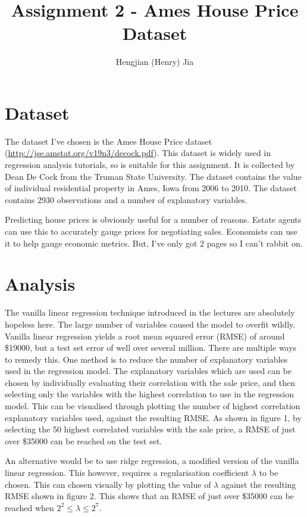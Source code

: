 \documentclass[10pt, twoside]{article}
\begin{document}
\title{Assignment 2 - Ames House Price Dataset}
\author{Hengjian (Henry) Jia}
\maketitle


\section{Dataset}

The dataset I've chosen is the Ames House Price dataset (\url{http://jse.amstat.org/v19n3/decock.pdf}). This dataset is widely used in regression analysis tutorials, so is suitable for this assignment. It is collected by Dean De Cock from the Truman State University. The dataset contains the value of individual residential property in Ames, Iowa  from 2006 to 2010. The dataset contains 2930 observations and a number of explanatory variables.

Predicting house prices is obviously useful for a number of reasons. Estate agents can use this to accurately gauge prices for negotiating sales. Economists can use it to help gauge economic metrics. But, I've only got 2 pages so I can't rabbit on.

\section{Analysis}

The vanilla linear regression technique introduced in the lectures are absolutely hopeless here. The large number of variables caused the model to overfit wildly. Vanilla linear regression yields a root mean squared error (RMSE) of around \$19000, but a test set error of well over several million. There are multiple ways to remedy this. One method is to reduce the number of explanatory variables used in the regression model. The explanatory variables which are used can be chosen by individually evaluating their correlation with the sale price, and then selecting only the variables with the highest correlation to use in the regression model. This can be visualised through plotting the number of highest correlation explanatory variables used, against the resulting RMSE. As shown in figure 1, by selecting the 50 highest correlated variables with the sale price, a RMSE of just over \$35000 can be reached on the test set.

An alternative would be to use ridge regression, a modified version of the vanilla linear regression. This however, requires a regularisation coefficient $\lambda$ to be chosen. This can chosen visually by plotting the value of $\lambda$ against the resulting RMSE shown in figure 2. This shows that an RMSE of just over \$35000 can be reached when $2^2 \leq \lambda \leq 2^7$.
\end{document}
